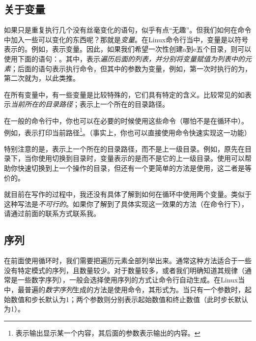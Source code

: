 \subsection{关于变量}\label{subsec:简单for循环-关于变量}

如果只是重复执行几个没有丝毫变化的语句，似乎有点“无趣”。但我们如何在命令中加入一些可以变化的东西呢？那就是\emph{变量}。在Linux命令行当中，变量是以\code{\$}符号表示的。例如，表示变量。因此，如果我们希望一次性创建a到e五个目录，则可以使用下面的语句：。其中，表示\emph{遍历后面的列表，并分别将变量赋值为列表中的元素}；后面的语句表示执行命令，但其中的参数为变量，例如，第一次时执行的为，第二次就为，以此类推。

\begin{extend}
    在所有变量中，有一些变量是比较特殊的，它们具有特定的含义。比较常见的如表示\emph{当前所在的目录路径}；表示上一个所在的目录路径。

    在一般的命令行中，你也可以在必要的时候使用这些命令（哪怕不是在循环中）。例如，表示打印当前路径\footnote{表示输出显示某一个内容，其后面的参数表示输出的内容。}。（事实上，你也可以直接使用命令快速实现这一功能）

    特别注意的是，表示上一个所在的目录路径，而不是上一级目录。例如，原先在目录下，当你使用切换到目录时，变量表示的是而不是它的上一级目录。使用可以帮助你快速切换到上一个操作的目录，但还有一个更简单的方法是使用，这二者是等价的。
\end{extend}

\begin{attention}
    就目前在写作的过程中，我还没有具体了解到如何在循环中使用两个变量。类似于这种写法是\emph{不可行的}。如果你了解到了具体实现这一效果的方法（在命令行下），请通过前面的联系方式联系我。
\end{attention}

\subsection{序列}\label{subsec:简单for循环-seq序列}

在前面使用循环时，我们需要把遍历元素全部列举出来。通常这种方法适合于一些没有特定模式的序列，且数量较少。对于数量较多，或者我们明确知道其规律（通常是一些数字序列），一般会选择使用序列的方式让命令行自动生成。在Linux当中，最普遍的\emph{数字序列}生成的方法是使用命令，其形式为。当只有一个参数时，起始数值和步长默认为1；两个参数则分别表示起始数值和终止数值（此时步长默认为1）。

